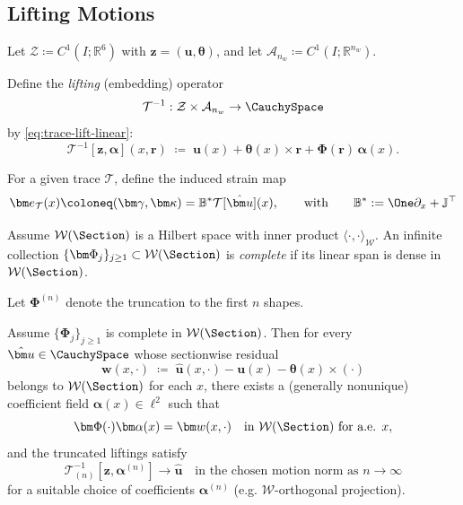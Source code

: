 \subsection{Lifting Motions}

\begin{definition}
\label{def:trace-lifting}
Let $\mathcal Z\coloneq C^1(I;\mathbb R^6)$ with $\bm z=(\bm u,\bm\theta)$, and
let $\mathcal A_{n_w}\coloneq C^1(I;\mathbb R^{n_w})$.

Define the \emph{lifting} (embedding) operator
\[
\mathcal T^{-1}:\mathcal Z\times \mathcal A_{n_w}\to \CauchySpace
\]
by \eqref{eq:trace-lift-linear}:
\begin{equation}
\mathcal T^{-1}[\bm z,\bm\alpha](x,\bm{r})
\;\coloneq\;
\bm{u}(x)
+\bm\theta(x)\times\bm{r}
+\bm\Phi(\bm{r})\,\bm\alpha(x).
\end{equation}
\end{definition}

For a given trace $\mathcal T$, define the induced strain map
\[
  \bm e_{\mathcal T}(x)\coloneq (\bm\gamma,\bm\kappa) = \mathbb{B}^* \mathcal T[\hat{\bm u}](x),
  \qquad\text{with}\qquad 
  \mathbb{B}^* := \One \partial_x + \mathbb{J}^{\top}
\]

\begin{Aside}
\begin{definition}
\label{def:phi-complete}
Assume $\mathcal W(\Section)$ is a Hilbert space with inner product $\langle\cdot,\cdot\rangle_{\mathcal W}$.
An infinite collection $\{\bm\Phi_j\}_{j\ge1}\subset\mathcal W(\Section)$ is \emph{complete} if its linear span is dense in $\mathcal W(\Section)$.

Let $\bm\Phi^{(n)}$ denote the truncation to the first $n$ shapes.
\end{definition}

\begin{proposition}
\label{prop:limit-exactness}
Assume $\{\bm\Phi_j\}_{j\ge1}$ is complete in $\mathcal W(\Section)$.
Then for every $\hat{\bm u}\in\CauchySpace$ whose sectionwise residual
\[
\bm w(x,\cdot)\;\coloneq\; \hat{\bm u}(x,\cdot)-\bm u(x)-\bm\theta(x)\times(\cdot)
\]
belongs to $\mathcal W(\Section)$ for each $x$, there exists a (generally nonunique) coefficient
field $\bm\alpha(x)\in\ell^2$ such that
\[
\bm\Phi(\cdot)\bm\alpha(x)=\bm w(x,\cdot)\quad\text{in }\mathcal W(\Section)\ \text{for a.e. }x,
\]
and the truncated liftings satisfy
\[
\mathcal T^{-1}_{(n)}[\bm z,\bm\alpha^{(n)}]\to \hat{\bm u}
\quad\text{in the chosen motion norm as }n\to\infty
\]
for a suitable choice of coefficients $\bm\alpha^{(n)}$ (e.g. $\mathcal W$-orthogonal projection).
\end{proposition}
\end{Aside}



